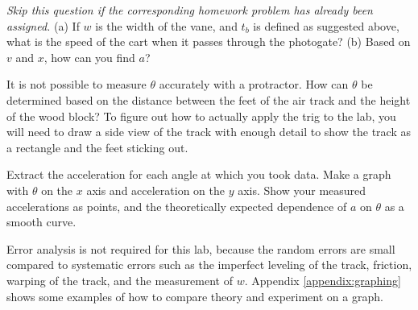 \prelabquestion   \emph{Skip this question if the corresponding homework problem
has already been assigned.} (a) If $w$ is the width of the vane, and $t_b$ is defined
as suggested above, what is the speed of the cart when it
passes through the photogate? 
(b) Based on $v$ and $x$, how can you find $a$?

\prelabquestion  It is not possible to measure $\theta $ accurately with
a protractor.  How can $\theta $ be determined based on the
distance between the feet of the air track and the
height of the wood block? To figure out how to actually apply the trig to the
lab, you will need to draw a side view of the track with enough detail to
show the track as a rectangle and the feet sticking out.

\analysis

Extract the acceleration for each angle at which you took
data.  Make a graph with $\theta $ on the $x$ axis and
acceleration on the $y$ axis.  Show your measured accelerations
as points, and the theoretically expected dependence of $a$
on $\theta $ as a smooth curve.

Error analysis is not required for this lab, because the
random errors are small compared to systematic errors such
as the imperfect leveling of the track, friction,
warping of the track, and the measurement of $w$.
Appendix \ref{appendix:graphing} shows some examples of how
to compare theory and experiment on a graph.
